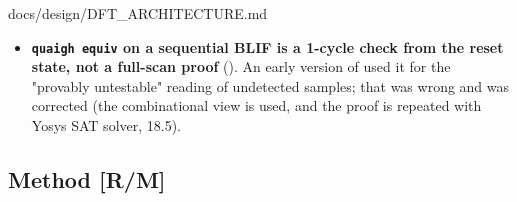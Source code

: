 \begin{relocated}{docs/design/DFT_ARCHITECTURE.md}
\begin{itemize}
  \textbf{Memory is O(patterns x faults).} 
  keeps
  \texttt{pattern\_\allowbreak{}detections:\allowbreak{}\ Vec<Vec<bool>>}
  (one byte per pattern-fault pair) and the compression step adds
   /  index vectors.
  Each hard fault adds 64 patterns ().
  {[}A: the per-phase peak was not measured; the fabric kill point
  matches the byte matrix, see 18.3.{]}
\item
  \textbf{\texttt{quaigh\ equiv} on a sequential BLIF is a 1-cycle check
  from the reset state, not a full-scan proof}
  (). An early version of
   used it for the "provably untestable" reading of
  undetected samples; that was wrong and was corrected (the
  combinational view is used, and the proof is repeated with
  Yosys\textquotesingle{} SAT solver, 18.5).
\end{itemize}

\subsection{Method {[}R/M{]}}\label{tm:ch:dft-architecture:182-method-rm}

{\footnotesize\setlength{\tabcolsep}{3pt}

}
\end{relocated}
